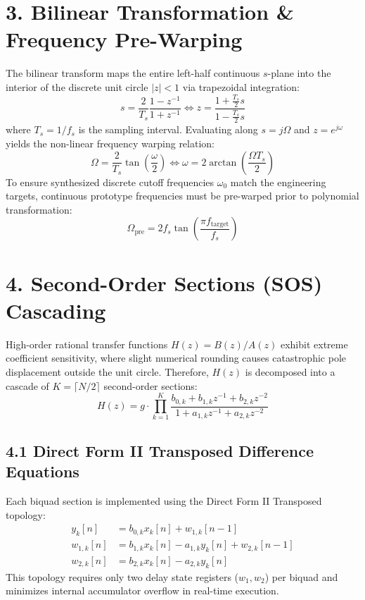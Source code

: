 \documentclass[11pt,a4paper]{article}
\begin{document}
\section*{3. Bilinear Transformation \& Frequency Pre-Warping}

The bilinear transform maps the entire left-half continuous $s$-plane into the interior of the discrete unit circle $|z| < 1$ via trapezoidal integration:
\begin{equation}
s = \frac{2}{T_s} \frac{1 - z^{-1}}{1 + z^{-1}} \iff z = \frac{1 + \frac{T_s}{2} s}{1 - \frac{T_s}{2} s}
\end{equation}
where $T_s = 1/f_s$ is the sampling interval. Evaluating along $s = j\Omega$ and $z = e^{j\omega}$ yields the non-linear frequency warping relation:
\begin{equation}
\Omega = \frac{2}{T_s} \tan\left(\frac{\omega}{2}\right) \iff \omega = 2 \arctan\left(\frac{\Omega T_s}{2}\right)
\end{equation}
To ensure synthesized discrete cutoff frequencies $\omega_0$ match the engineering targets, continuous prototype frequencies must be pre-warped prior to polynomial transformation:
\begin{equation}
\Omega_{\text{pre}} = 2 f_s \tan\left(\frac{\pi f_{\text{target}}}{f_s}\right)
\end{equation}

\section*{4. Second-Order Sections (SOS) Cascading}

High-order rational transfer functions $H(z) = B(z)/A(z)$ exhibit extreme coefficient sensitivity, where slight numerical rounding causes catastrophic pole displacement outside the unit circle. Therefore, $H(z)$ is decomposed into a cascade of $K = \lceil N/2 \rceil$ second-order sections:
\begin{equation}
H(z) = g \cdot \prod_{k=1}^{K} \frac{b_{0,k} + b_{1,k} z^{-1} + b_{2,k} z^{-2}}{1 + a_{1,k} z^{-1} + a_{2,k} z^{-2}}
\end{equation}

\subsection*{4.1 Direct Form II Transposed Difference Equations}
Each biquad section is implemented using the Direct Form II Transposed topology:
\begin{align}
y_k[n] &= b_{0,k} x_k[n] + w_{1,k}[n-1] \\
w_{1,k}[n] &= b_{1,k} x_k[n] - a_{1,k} y_k[n] + w_{2,k}[n-1] \\
w_{2,k}[n] &= b_{2,k} x_k[n] - a_{2,k} y_k[n]
\end{align}
This topology requires only two delay state registers ($w_1, w_2$) per biquad and minimizes internal accumulator overflow in real-time execution.
\end{document}
